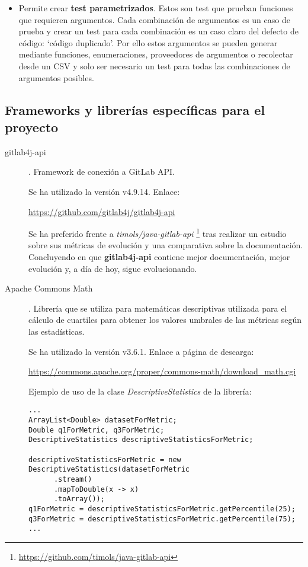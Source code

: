 \begin{description}
\begin{itemize}
			\item Permite crear \textbf{test parametrizados}. Estos son test que prueban funciones que requieren argumentos. Cada combinación de argumentos es un caso de prueba y crear un test para cada combinación es un caso claro del defecto de código: `código duplicado'. Por ello estos argumentos se pueden generar mediante funciones, enumeraciones, proveedores de argumentos o recolectar desde un CSV y solo ser necesario un test para todas las combinaciones de argumentos posibles.
		\end{itemize}
\end{description}
\subsection{Frameworks y librerías específicas para el proyecto}
\begin{description}
	\item[gitlab4j-api]. Framework de conexión a GitLab API. 
	
		Se ha utilizado la versión  v4.9.14. Enlace:
		
		\url{https://github.com/gitlab4j/gitlab4j-api}
		
		Se ha preferido frente a \textit{timols/java-gitlab-api} \footnote{\url{https://github.com/timols/java-gitlab-api}} tras realizar un estudio sobre sus métricas de evolución y una comparativa sobre la documentación. Concluyendo en que \textbf{gitlab4j-api} contiene mejor documentación, mejor evolución y, a día de hoy, sigue evolucionando.
		
	\item[Apache Commons Math]. Librería que se utiliza para matemáticas descriptivas utilizada para el cálculo de cuartiles para obtener los valores umbrales de las métricas según las estadísticas. 
	
		Se ha utilizado la versión  v3.6.1. Enlace a página de descarga:
	
		\url{https://commons.apache.org/proper/commons-math/download_math.cgi}
		
		Ejemplo de uso de la clase \textit{DescriptiveStatistics} de la librería:
		
\begin{minipage}{\linewidth}
{\tiny 
\begin{lstlisting}[breaklines]
...
ArrayList<Double> datasetForMetric;
Double q1ForMetric, q3ForMetric;
DescriptiveStatistics descriptiveStatisticsForMetric;

descriptiveStatisticsForMetric = new DescriptiveStatistics(datasetForMetric
	  .stream()
	  .mapToDouble(x -> x)
	  .toArray());
q1ForMetric = descriptiveStatisticsForMetric.getPercentile(25);
q3ForMetric = descriptiveStatisticsForMetric.getPercentile(75);
...
\end{lstlisting}
}
\end{minipage}		

\end{description}
